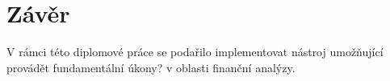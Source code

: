 \chapter{Závěr}
V rámci této diplomové práce se podařilo implementovat nástroj umožňující provádět fundamentální úkony? v oblasti finanční analýzy.

